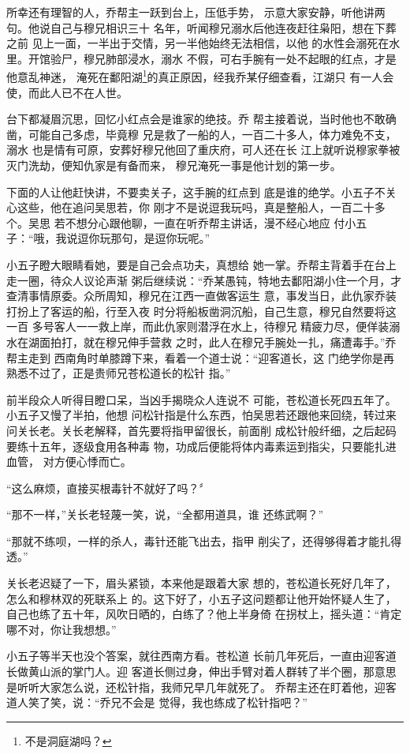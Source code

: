 所幸还有理智的人，乔帮主一跃到台上，压低手势，
示意大家安静，听他讲两句。他说自己与穆兄相识三十
名年，听闻穆兄溺水后他连夜赶往枭阳，想在下葬之前
见上一面，一半出于交情，另一半他始终无法相信，以他
的水性会溺死在水里。开馆验尸，穆兄肺部浸水，溺水
不假，可右手腕有一处不起眼的红点，才是他意乱神迷，
淹死在鄱阳湖\footnote{不是洞庭湖吗？}的真正原因，经我乔某仔细查看，江湖只
有一人会使，而此人已不在人世。

台下都凝眉沉思，回忆小红点会是谁家的绝技。乔
帮主接着说，当时他也不敢确凿，可能自己多虑，毕竟穆
兄是救了一船的人，一百二十多人，体力难免不支，溺水
也是情有可原，安葬好穆兄他回了重庆府，可人还在长
江上就听说穆家拳被灭门洗劫，便知仇家是有备而来，
穆兄淹死一事是他计划的第一步。

下面的人让他赶快讲，不要卖关子，这手腕的红点到
底是谁的绝学。小五子不关心这些，他在追问吴思若，你
刚才不是说逗我玩吗，真是整船人，一百二十多个。吴思
若不想分心跟他聊，一直在听乔帮主讲话，漫不经心地应
付小五子：“哦，我说逗你玩那句，是逗你玩呢。”

小五子瞪大眼睛看她，要是自己会点功夫，真想给
她一掌。乔帮主背着手在台上走一圈，待众人议论声渐
粥后继续说：“乔某愚钝，特地去鄱阳湖小住一个月，才
查清事情原委。众所周知，穆兄在江西一直做客运生
意，事发当日，此仇家乔装打扮上了客运的船，行至入夜
时分将船板凿洞沉船，自己生意，穆兄自然要将这一百
多号客人一一救上岸，而此仇家则潜浮在水上，待穆兄
精疲力尽，便佯装溺水在湖面拍打，就在穆兄伸手营救
之时，此人在穆兄手腕处一扎，痛遭毒手。”乔帮主走到
西南角时单膝蹲下来，看着一个道士说：“迎客道长，这
门绝学你是再熟悉不过了，正是贵师兄苍松道长的松针
指。”

前半段众人听得目瞪口呆，当凶手揭晓众人连说不
可能，苍松道长死四五年了。小五子又慢了半拍，他想
问松针指是什么东西，怕吴思若还跟他来回绕，转过来
问关长老。关长老解释，首先要将指甲留很长，前面削
成松针般纤细，之后起码要练十五年，逐级食用各种毒
物，功成后便能将体内毒素运到指尖，只要能扎进血管，
对方便心悸而亡。

“这么麻烦，直接买根毒针不就好了吗？〞

“那不一样，”关长老轻蔑一笑，说，“全都用道具，谁
还练武啊？”

“那就不练呗，一样的杀人，毒针还能飞出去，指甲
削尖了，还得够得着才能扎得透。”

关长老迟疑了一下，眉头紧锁，本来他是跟着大家
想的，苍松道长死好几年了，怎么和穆林双的死联系上
的。这下好了，小五子这问题都让他开始怀疑人生了，
自己也练了五十年，风吹日晒的，白练了？他上半身倚
在拐杖上，摇头道：“肯定哪不对，你让我想想。”

小五子等半天也没个答案，就往西南方看。苍松道
长前几年死后，一直由迎客道长做黄山派的掌门人。迎
客道长侧过身，伸出手臂对着人群转了半个圈，那意思
是听听大家怎么说，还松针指，我师兄早几年就死了。
乔帮主还在盯着他，迎客道人笑了笑，说：“乔兄不会是
觉得，我也练成了松针指吧？”

